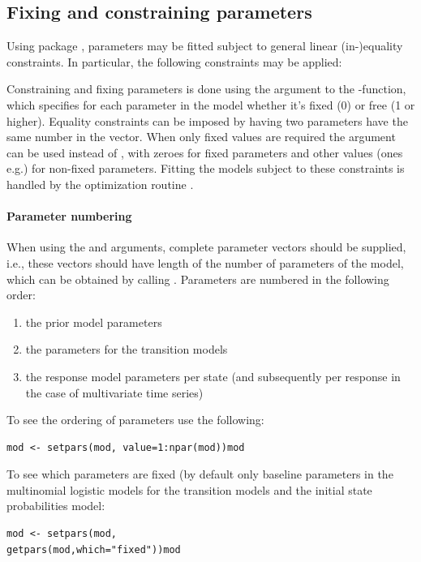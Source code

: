 \documentclass[article]{jss}
\begin{document}
\subsection{Fixing and constraining parameters}

Using package , parameters may be fitted subject to 
general linear (in-)equality constraints. In particular, the following
constraints may be applied: 



Constraining and fixing parameters is done using the 
argument to the -function, which specifies for each
parameter in the model whether it's fixed (0) or free (1 or higher).
Equality constraints can be imposed by having two parameters have the
same number in the  vector.  When only fixed values are
required the  argument can be used instead of
, with zeroes for fixed parameters and other values (ones
e.g.) for non-fixed parameters.  Fitting the models subject to these
constraints is handled by the optimization routine .

\paragraph{Parameter numbering} When using the  and
 arguments, complete parameter vectors should be supplied,
i.e., these vectors should have length of the number of parameters of
the model, which can be obtained by calling .
Parameters are numbered in the following order:
\begin{enumerate}
	\item  the prior model parameters

	\item  the parameters for the transition models
	
	\item  the response model parameters per state (and subsequently
	per response in the case of multivariate time series)

\end{enumerate}

To see the ordering of parameters use the following:
\begin{verbatim}
mod <- setpars(mod, value=1:npar(mod))mod
\end{verbatim}

To see which parameters are fixed (by default only baseline parameters
in the multinomial logistic models for the transition models and the
initial state probabilities model:
\begin{verbatim}
mod <- setpars(mod,
getpars(mod,which="fixed"))mod
\end{verbatim}
\end{document}
